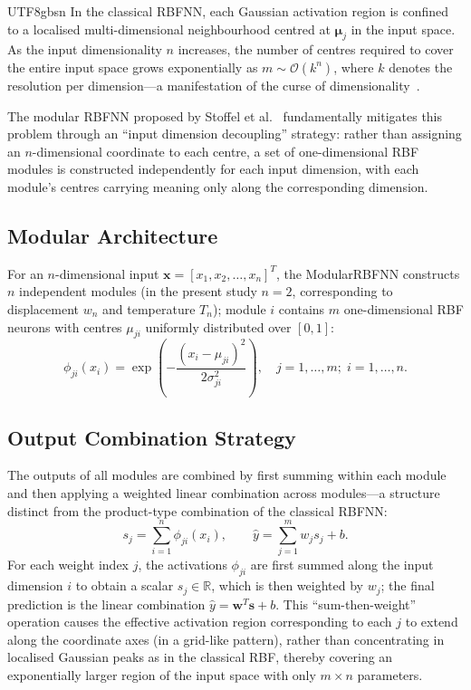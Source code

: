 \documentclass[a4paper,12pt]{report}
\begin{document}
\begin{CJK}{UTF8}{gbsn}
In the classical RBFNN, each Gaussian activation region is confined to a localised
multi-dimensional neighbourhood centred at $\boldsymbol{\mu}_j$ in the input space.
As the input dimensionality $n$ increases, the number of centres required to cover the
entire input space grows exponentially as $m \sim \mathcal{O}(k^n)$, where $k$ denotes
the resolution per dimension---a manifestation of the curse of dimensionality~\cite{bellman1957,fuhg2021local}.

The modular RBFNN proposed by Stoffel et al.~\cite{stoffel2020} fundamentally mitigates
this problem through an ``input dimension decoupling'' strategy: rather than assigning
an $n$-dimensional coordinate to each centre, a set of one-dimensional RBF modules is
constructed independently for each input dimension, with each module's centres carrying
meaning only along the corresponding dimension.

\subsection{Modular Architecture}
\label{subsec:modular_arch}

For an $n$-dimensional input $\mathbf{x} = [x_1, x_2, \ldots, x_n]^T$, the
ModularRBFNN constructs $n$ independent modules (in the present study $n = 2$,
corresponding to displacement $w_n$ and temperature $T_n$); module $i$ contains $m$
one-dimensional RBF neurons with centres $\mu_{ji}$ uniformly distributed over $[0,1]$:
\begin{equation}
  \phi_{ji}(x_i) = \exp\!\left(-\frac{(x_i - \mu_{ji})^2}{2\sigma_{ji}^2}\right),
  \quad j=1,\ldots,m;\; i=1,\ldots,n.
  \label{eq:modular_rbf}
\end{equation}

\subsection{Output Combination Strategy}
\label{subsec:modular_output}

The outputs of all modules are combined by first summing within each module and then
applying a weighted linear combination across modules---a structure distinct from the
product-type combination of the classical RBFNN:
\begin{equation}
  s_j = \sum_{i=1}^{n} \phi_{ji}(x_i), \qquad
  \hat{y} = \sum_{j=1}^{m} w_j s_j + b.
  \label{eq:modular_output}
\end{equation}
For each weight index $j$, the activations $\phi_{ji}$ are first summed along the input
dimension $i$ to obtain a scalar $s_j \in \mathbb{R}$, which is then weighted by $w_j$;
the final prediction is the linear combination $\hat{y} = \mathbf{w}^T \mathbf{s} + b$.
This ``sum-then-weight'' operation causes the effective activation region corresponding
to each $j$ to extend along the coordinate axes (in a grid-like pattern), rather than
concentrating in localised Gaussian peaks as in the classical RBF, thereby covering an
exponentially larger region of the input space with only $m \times n$ parameters.


\end{CJK}
\end{document}
